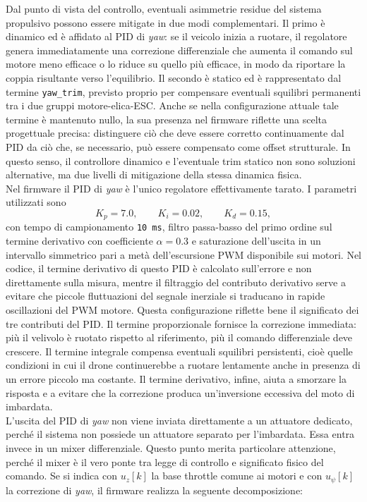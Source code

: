\documentclass[11pt]{report}
\begin{document}
	Dal punto di vista del controllo, eventuali asimmetrie residue del sistema propulsivo possono essere mitigate in due modi complementari. Il primo è dinamico ed è affidato al PID di \textit{yaw}: se il veicolo inizia a ruotare, il regolatore genera immediatamente una correzione differenziale che aumenta il comando sul motore meno efficace o lo riduce su quello più efficace, in modo da riportare la coppia risultante verso l'equilibrio. Il secondo è statico ed è rappresentato dal termine \texttt{yaw\_trim}, previsto proprio per compensare eventuali squilibri permanenti tra i due gruppi motore-elica-ESC. Anche se nella configurazione attuale tale termine è mantenuto nullo, la sua presenza nel firmware riflette una scelta progettuale precisa: distinguere ciò che deve essere corretto continuamente dal PID da ciò che, se necessario, può essere compensato come offset strutturale. In questo senso, il controllore dinamico e l'eventuale trim statico non sono soluzioni alternative, ma due livelli di mitigazione della stessa dinamica fisica.\\
	Nel firmware il PID di \textit{yaw} è l'unico regolatore effettivamente tarato. I parametri utilizzati sono
	\begin{equation}
		K_p = 7.0, \qquad K_i = 0.02, \qquad K_d = 0.15,
	\end{equation}
	con tempo di campionamento \texttt{10 ms}, filtro passa-basso del primo ordine sul termine derivativo con coefficiente $\alpha = 0.3$ e saturazione dell'uscita in un intervallo simmetrico pari a metà dell'escursione PWM disponibile sui motori. Nel codice, il termine derivativo di questo PID è calcolato sull'errore e non direttamente sulla misura, mentre il filtraggio del contributo derivativo serve a evitare che piccole fluttuazioni del segnale inerziale si traducano in rapide oscillazioni del PWM motore. Questa configurazione riflette bene il significato dei tre contributi del PID. Il termine proporzionale fornisce la correzione immediata: più il velivolo è ruotato rispetto al riferimento, più il comando differenziale deve crescere. Il termine integrale compensa eventuali squilibri persistenti, cioè quelle condizioni in cui il drone continuerebbe a ruotare lentamente anche in presenza di un errore piccolo ma costante. Il termine derivativo, infine, aiuta a smorzare la risposta e a evitare che la correzione produca un'inversione eccessiva del moto di imbardata.\\
	L'uscita del PID di \textit{yaw} non viene inviata direttamente a un attuatore dedicato, perché il sistema non possiede un attuatore separato per l'imbardata. Essa entra invece in un mixer differenziale. Questo punto merita particolare attenzione, perché il mixer è il vero ponte tra legge di controllo e significato fisico del comando. Se si indica con $u_z[k]$ la base throttle comune ai motori e con $u_{\psi}[k]$ la correzione di \textit{yaw}, il firmware realizza la seguente decomposizione:
\end{document}
